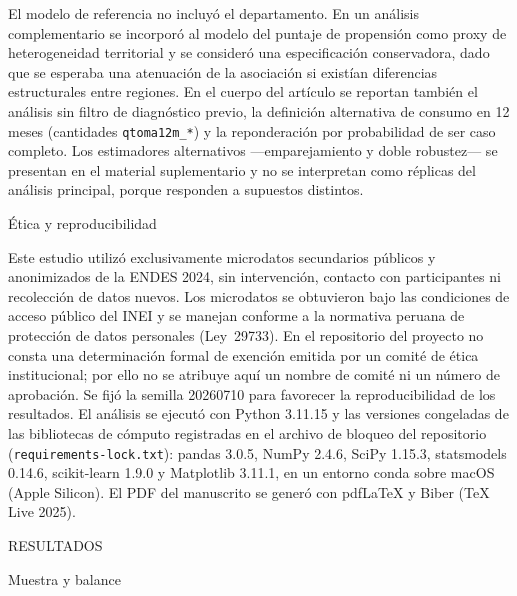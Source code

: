 \documentclass[man,11pt,donotrepeattitle,floatsintext]{apa7}
\makeatletter
\renewcommand{\section}{\@startsection {section}{1}{\z@}%
    {\b@level@one@skip}{\e@level@one@skip}%
    {\normalfont\large\bfseries\raggedright}}
\renewcommand{\subsection}{\@startsection{subsection}{2}{\z@}%
    {\b@level@two@skip}{\e@level@two@skip}%
    {\normalfont\normalsize\bfseries\raggedright}}
\makeatother
\begin{document}
El modelo de referencia no incluyó el departamento. En un análisis complementario se incorporó al modelo del puntaje de propensión como proxy de heterogeneidad territorial y se consideró una especificación conservadora, dado que se esperaba una atenuación de la asociación si existían diferencias estructurales entre regiones. En el cuerpo del artículo se reportan también el análisis sin filtro de diagnóstico previo, la definición alternativa de consumo en 12 meses (cantidades \texttt{qtoma12m\_*}) y la reponderación por probabilidad de ser caso completo. Los estimadores alternativos ---emparejamiento y doble robustez--- se presentan en el material suplementario y no se interpretan como réplicas del análisis principal, porque responden a supuestos distintos.

\subsection{Ética y reproducibilidad}

Este estudio utilizó exclusivamente microdatos secundarios públicos y anonimizados de la ENDES 2024, sin intervención, contacto con participantes ni recolección de datos nuevos. Los microdatos se obtuvieron bajo las condiciones de acceso público del INEI y se manejan conforme a la normativa peruana de protección de datos personales (Ley~29733). En el repositorio del proyecto no consta una determinación formal de exención emitida por un comité de ética institucional; por ello no se atribuye aquí un nombre de comité ni un número de aprobación. Se fijó la semilla 20260710 para favorecer la reproducibilidad de los resultados. El análisis se ejecutó con Python 3.11.15 y las versiones congeladas de las bibliotecas de cómputo registradas en el archivo de bloqueo del repositorio (\texttt{requirements-lock.txt}): pandas 3.0.5, NumPy 2.4.6, SciPy 1.15.3, statsmodels 0.14.6, scikit-learn 1.9.0 y Matplotlib 3.11.1, en un entorno conda sobre macOS (Apple Silicon). El PDF del manuscrito se generó con pdfLaTeX y Biber (TeX Live 2025).

\section{RESULTADOS}

\subsection{Muestra y balance}
\end{document}
